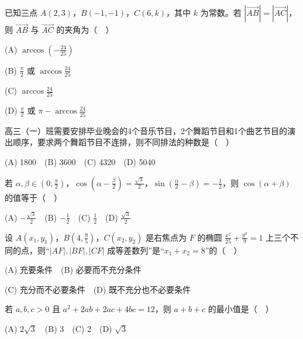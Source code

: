 \begin{question}
已知三点 \(A(2,3)\)，\(B(-1,-1)\)，\(C(6,k)\)，其中 \(k\) 为常数。若 \(|\overrightarrow{AB}|=|\overrightarrow{AC}|\)，则 \(\overrightarrow{AB}\) 与 \(\overrightarrow{AC}\) 的夹角为（　）

(A) \(\arccos\left(-\frac{24}{25}\right)\)

(B) \(\frac\pi2\) 或 \(\arccos\frac{24}{25}\)

(C) \(\arccos\frac{24}{25}\)

(D) \(\frac\pi2\) 或 \(\pi-\arccos\frac{24}{25}\)

\end{question}
\begin{question}
高三（一）班需要安排毕业晚会的4个音乐节目，2个舞蹈节目和1个曲艺节目的演出顺序，要求两个舞蹈节目不连排，则不同排法的种数是（　）

(A) 1800　(B) 3600　(C) 4320　(D) 5040

\end{question}
\begin{question}
若 \(\alpha,\beta\in\left(0,\frac\pi2\right)\)，\(\cos\left(\alpha-\frac\beta2\right)=\frac{\sqrt3}{2}\)，\(\sin\left(\frac\alpha2-\beta\right)=-\frac12\)，则 \(\cos(\alpha+\beta)\) 的值等于（　）

(A) \(-\frac{\sqrt3}{2}\)　(B) \(-\frac12\)　(C) \(\frac12\)　(D) \(\frac{\sqrt3}{2}\)

\end{question}
\begin{question}
设 \(A(x_1,y_1)\)，\(B\left(4,\frac95\right)\)，\(C(x_2,y_2)\) 是右焦点为 \(F\) 的椭圆 \(\frac{x^2}{25}+\frac{y^2}{9}=1\) 上三个不同的点，则“\(|AF|,|BF|,|CF|\) 成等差数列”是“\(x_1+x_2=8\)”的（　）

(A) 充要条件　(B) 必要而不充分条件

(C) 充分而不必要条件　(D) 既不充分也不必要条件

\end{question}
\begin{question}
若 \(a,b,c>0\) 且 \(a^2+2ab+2ac+4bc=12\)，则 \(a+b+c\) 的最小值是（　）

(A) \(2\sqrt3\)　(B) 3　(C) 2　(D) \(\sqrt3\)

\end{question}

